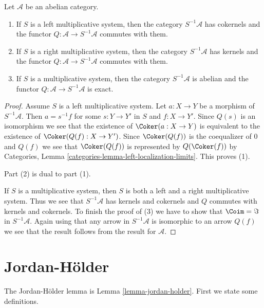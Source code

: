 \begin{lemma}
\label{lemma-localization-abelian}
Let $\mathcal{A}$ be an abelian category.
\begin{enumerate}
\item If $S$ is a left multiplicative system, then
the category $S^{-1}\mathcal{A}$ has cokernels and the functor
$Q : \mathcal{A} \to S^{-1}\mathcal{A}$ commutes with them.
\item If $S$ is a right multiplicative system, then
the category $S^{-1}\mathcal{A}$ has kernels and the functor
$Q : \mathcal{A} \to S^{-1}\mathcal{A}$ commutes with them.
\item If $S$ is a multiplicative system, then the category
$S^{-1}\mathcal{A}$ is abelian and the functor
$Q : \mathcal{A} \to S^{-1}\mathcal{A}$ is exact.
\end{enumerate}
\end{lemma}

\begin{proof}
Assume $S$ is a left multiplicative system. Let $a : X \to Y$ be a morphism
of $S^{-1}\mathcal{A}$. Then $a = s^{-1}f$ for some $s : Y \to Y'$
in $S$ and $f : X \to Y'$. Since $Q(s)$ is an isomorphism we see that
the existence of $\Coker(a : X \to Y)$ is equivalent to the existence
of $\Coker(Q(f) : X \to Y')$. Since $\Coker(Q(f))$ is the
coequalizer of $0$ and $Q(f)$ we see that $\Coker(Q(f))$ is
represented by $Q(\Coker(f))$ by
Categories, Lemma \ref{categories-lemma-left-localization-limits}.
This proves (1).

\medskip\noindent
Part (2) is dual to part (1).

\medskip\noindent
If $S$ is a multiplicative system, then $S$ is both a left and a right
multiplicative system. Thus we see that $S^{-1}\mathcal{A}$ has
kernels and cokernels and $Q$ commutes with kernels and cokernels.
To finish the proof of (3) we have to show that $\Coim = \Im$ in
$S^{-1}\mathcal{A}$. Again using that any arrow in $S^{-1}\mathcal{A}$
is isomorphic to an arrow $Q(f)$ we see that the result follows
from the result for $\mathcal{A}$.
\end{proof}




\section{Jordan-H\"older}
\label{section-jordan-holder}

\noindent
The Jordan-H\"older lemma is Lemma \ref{lemma-jordan-holder}.
First we state some definitions.

